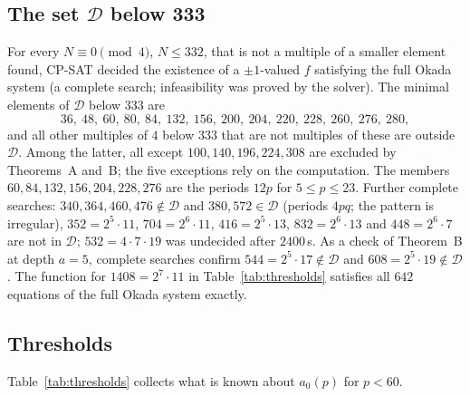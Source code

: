 \documentclass[11pt,a4paper]{article}
\theoremstyle{definition}
\theoremstyle{remark}
\newcommand{\cD}{\mathcal{D}}
\begin{document}
\subsection{The set \texorpdfstring{$\cD$}{D} below 333}
For every $N\equiv0\pmod4$, $N\le332$, that is not a multiple of a smaller element found, CP-SAT decided the existence of a $\pm1$-valued $f$ satisfying the full Okada system (a complete search; infeasibility was proved by the solver). The minimal elements of $\cD$ below $333$ are
\[
36,\ 48,\ 60,\ 80,\ 84,\ 132,\ 156,\ 200,\ 204,\ 220,\ 228,\ 260,\ 276,\ 280,
\]
and all other multiples of $4$ below $333$ that are not multiples of these are outside $\cD$. Among the latter, all except $100,140,196,224,308$ are excluded by Theorems~A and~B; the five exceptions rely on the computation. The members $60,84,132,156,204,228,276$ are the periods $12p$ for $5\le p\le23$. Further complete searches: $340,364,460,476\notin\cD$ and $380,572\in\cD$ (periods $4pq$; the pattern is irregular), $352=2^5\cdot11$, $704=2^6\cdot11$, $416=2^5\cdot13$, $832=2^6\cdot13$ and $448=2^6\cdot7$ are not in $\cD$; $532=4\cdot7\cdot19$ was undecided after $2400$\,s. As a check of Theorem~B at depth $a=5$, complete searches confirm $544=2^5\cdot17\notin\cD$ and $608=2^5\cdot19\notin\cD$. The function for $1408=2^7\cdot11$ in Table~\ref{tab:thresholds} satisfies all $642$ equations of the full Okada system exactly.

\subsection{Thresholds}
Table~\ref{tab:thresholds} collects what is known about $a_0(p)$ for $p<60$.
\end{document}
